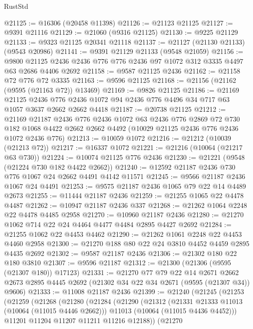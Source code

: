 \begin{lexlean}{RustStd}
\begin{coremodule}
@21125 := @16306 (@20458 @11398)
@21126 := @21123 @21125
@21127 := @9391 @21116
@21129 := @21060 (@9316 @21125)
@21130 := @9225 @21129
@21133 := @9323 @21125 @20341 @21118
@21137 := @21127 (@21130 @21133) (@9543 @20986)
@21141 := @9391 @21129 @21133 (@9548 @21059)
@21156 := @9800 @21125 @2436 @2436 @776 @776 @2436 @97 @1072 @312 @3335 @4497 @63 @2686 @4406 @2692
@21158 := @9587 @21125 @2436
@21162 := @21158 @72 @776 @72 @3335
@21163 := @9596 @21125
@21168 := @21156 (@21162 (@9595 (@21163 @72)) @13469)
@21169 := @9826 @21125
@21186 := @21169
    @21125
    @2436
    @776
    @2436
    @1072
    @94
    @2436
    @776
    @4496
    @34
    @717
    @63
    @1057
    @3637
    @2662
    @2662
    @4418
@21187 := @20738 @21125
@21212 := @21169
    @21187
    @2436
    @776
    @2436
    @1072
    @63
    @2436
    @776
    @2869
    @72
    @730
    @182
    @1068
    @4422
    @2662
    @2662
    @4492
    (@10029 @21125 @2436 @776 @2436 @1072 @2436 @776)
@21213 := @10059 @1072
@21216 := @21212 (@10039 (@21213 @72))
@21217 := @16337 @1072
@21221 := @21216 (@10064 (@21217 @63 @730))
@21224 := @10074 @21125 @776 @2436
@21230 := @21221 (@9548 (@21224 @730 @182 @4422 @2662))
@21240 := @12592 @21187 @2436 @730 @776 @1067 @24 @2662 @4491 @4142 @11571
@21245 := @9566 @21187 @2436 @1067 @24 @4491
@21253 := @9575 @21187 @2436 @1065 @79 @22 @14 @4489 @2673
@21255 := @11444 @21187 @2436
@21259 := @21255 @1065 @22 @4478 @4487
@21262 := @10947 @21187 @2436 @337
@21268 := @21262 @1064 @2248 @22 @4478 @4485 @2958
@21270 := @10960 @21187 @2436
@21280 := @21270 @1062 @714 @22 @24 @4464 @4477 @4484 @2895 @4427 @2692
@21284 := @21255 @1062 @22 @4453 @4462
@21290 := @21262 @1061 @2248 @22 @4453 @4460 @2958
@21300 := @21270 @188 @80 @22 @24 @3810 @4452 @4459 @2895 @4435 @2692
@21302 := @9587 @21187 @2436
@21306 := @21302 @180 @22 @180 @3810
@21307 := @9596 @21187
@21312 := @21300 (@21306 (@9595 (@21307 @180)) @17123)
@21331 := @21270
    @77
    @79
    @22
    @14
    @2671
    @2662
    @2673
    @2895
    @4445
    @2692
    (@21302 @34 @22 @34 @2671 (@9595 (@21307 @34)) @9606)
@21333 := @11008 @21187 @2436
@21399 := @21240
    (@21245
      (@21253
        (@21259
          (@21268
            (@21280
              (@21284
                (@21290
                  (@21312
                    (@21331 @21333 @11013 (@10064 (@11015 @4446 @2662)))
                    @11013
                    (@10064 (@11015 @4436 @4452)))
                  @11201
                  @11204
                  @11207
                  @11211
                  @11216
                  @12188))
              (@21270

\end{coremodule}
\end{lexlean}
